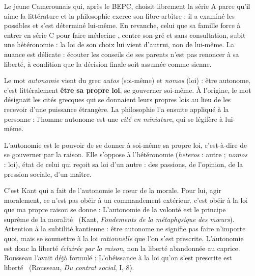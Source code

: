 \documentclass[11pt]{article}
\newcommand{\cle}[1]{{\popxbold\color{popdark}#1}}
\newcounter{popsec}
\newcounter{popsub}
\newcommand{\courssub}[1]{%
  \stepcounter{popsub}%
  \par\vspace{9pt}\noindent{\popxbold\fontsize{11.5}{13}\selectfont\color{popink}{\color{poporange}\thepopsec.\thepopsub}\hspace{6pt}#1}\par\nopagebreak\vspace{4pt}
}
\begin{document}
\begin{exemplebox}
Le jeune Camerounais qui, après le BEPC, choisit librement la série A parce qu'il aime la littérature et la philosophie exerce son \cle{libre-arbitre} : il a examiné les possibles et s'est déterminé lui-même. En revanche, celui que sa famille force à entrer en série C pour \guillemotleft faire médecine \guillemotright, contre son gré et sans consultation, subit une \cle{hétéronomie} : la loi de son choix lui vient d'autrui, non de lui-même. La nuance est délicate : écouter les conseils de ses parents n'est pas renoncer à sa liberté, à condition que la décision finale soit assumée comme sienne.
\end{exemplebox}

\courssub{L'autonomie : être sa propre loi}

\begin{savaistu}
Le mot \emph{autonomie} vient du grec \emph{autos} (soi-même) et \emph{nomos} (loi) : être autonome, c'est littéralement \textbf{être sa propre loi}, se gouverner soi-même. À l'origine, le mot désignait les cités grecques qui se donnaient leurs propres lois au lieu de les recevoir d'une puissance étrangère. La philosophie l'a ensuite appliqué à la personne : l'homme autonome est une \emph{cité en miniature}, qui se légifère à lui-même.
\end{savaistu}

\begin{definition}
L'\cle{autonomie} est le pouvoir de se donner à soi-même sa propre loi, c'est-à-dire de se gouverner par la raison. Elle s'oppose à l'\cle{hétéronomie} (\emph{heteros} : autre ; \emph{nomos} : loi), état de celui qui reçoit sa loi d'un autre : des passions, de l'opinion, de la pression sociale, d'un maître.
\end{definition}

C'est Kant qui a fait de l'autonomie le cœur de la morale. Pour lui, agir moralement, ce n'est pas obéir à un commandement extérieur, c'est obéir à la loi que ma propre raison se donne : \guillemotleft L'autonomie de la volonté est le principe suprême de la moralité \guillemotright\ (Kant, \emph{Fondements de la métaphysique des mœurs}). Attention à la subtilité kantienne : être autonome ne signifie pas faire n'importe quoi, mais se soumettre à la loi \emph{rationnelle} que l'on s'est prescrite. L'autonomie est donc la liberté \emph{éclairée par la raison}, non la liberté abandonnée au caprice. Rousseau l'avait déjà formulé : \guillemotleft L'obéissance à la loi qu'on s'est prescrite est liberté \guillemotright\ (Rousseau, \emph{Du contrat social}, I, 8).
\end{document}
